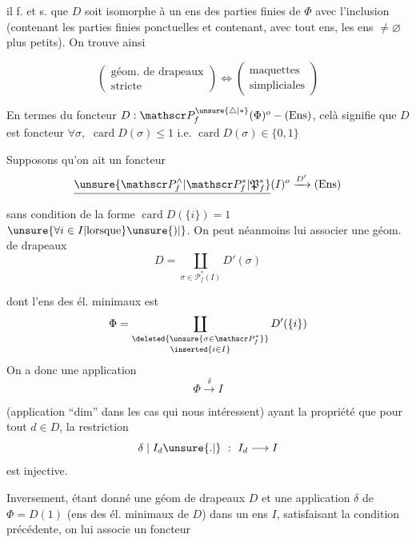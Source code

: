 il f. et s. que $D$ soit isomorphe à un ens des parties finies \inserted{$\ne\varnothing$} de $\Phi$ avec l'inclusion (contenant les parties finies ponctuelles et contenant, avec tout ens, les ens $\ne\varnothing$ plus petits). On trouve ainsi

\[
 \left(\begin{array}{c}\text{géom. de drapeaux}\\\text{stricte}\end{array}\right)
 \Longleftrightarrow
 \left(\begin{array}{c}\text{maquettes}\\\text{simpliciales}\end{array}\right)
\]

En termes du foncteur $D:\mathscr P_f^{\unsure{\triangle|*}}(\Phi)^o\mathbin{-}(\mathrm{Ens})$, celà signifie que $D$ est   foncteur     $\forall\sigma,$ $\operatorname{card}D(\sigma)\leq1$ i.e. $\operatorname{card}D(\sigma)\in\{0,1\}$


 Supposons qu'on ait un foncteur
\[
 \underline{\unsure{\mathscr P_f^\wedge|\mathscr P_f^*|\mathfrak P_f^*}}(I)^o\xrightarrow{D'}(\mathrm{Ens})
\]

sans condition de la forme $\operatorname{card}D(\{i\})=1$ $\unsure{\forall i\in I|\text{lorsque}}\unsure{)|{}}$. On peut néanmoins lui associer une géom. de drapeaux 
\[
 D=\coprod_{\sigma\in\mathscr P_f^*(I)}D'(\sigma)
\]

dont l'ens des él. minimaux est
\[
 \Phi=\coprod_{\substack{\deleted{\unsure{\sigma\in\mathscr P_f^*}}\\\inserted{i\in I}}}D'(\{i\})
\]
On a donc une application
\[
 \Phi\xrightarrow{\delta}I
\]

(application ``dim'' \deleted{\unsure{$\delta$}} dans les cas qui nous intéressent) ayant la propriété que pour tout $d\in D$, la restriction 
\[
 \delta\mid I_d\unsure{.|{}}\ :\ I_d\longrightarrow I
\]
est injective.

Inversement, étant donné une géom de drapeaux $D$ et une application $\delta$ de $\Phi=D(1)$ (ens des él. minimaux de $D$) dans un ens $I$, satisfaisant la condition précédente, on lui associe un foncteur

